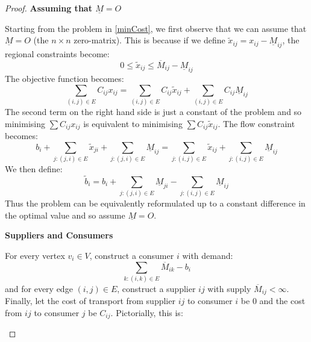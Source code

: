 \documentclass[../main.tex]{subfiles}
\begin{document}
\begin{proof}\par
  \textbf{Assuming that $\underline{M} = O$}\par
  Starting from the problem in \cref{minCost}, we first observe that we can assume that $\underline{M} = O$ (the $n \times n$ zero-matrix).
  This is because if we define $\widetilde{x}_{i j} = x_{i j} - \underline{M}_{i j}$, the regional constraints become:
  \[
    0 \leq \widetilde{x}_{i j} \leq \overline{M}_{i j} - \underline{M}_{i j}
  \]
  The objective function becomes:
  \[
    \sum_{(i, j) \in E} C_{i j}x_{i j} = \sum_{(i, j) \in E} C_{i j} \widetilde{x}_{i j} + \sum_{(i, j) \in E} C_{i j} \underline{M}_{i j}
  \]
  The second term on the right hand side is just a constant of the problem and so minimising $\sum C_{i j} x_{i j}$ is equivalent to minimising $\sum C_{i j} \widetilde{x}_{i j}$.
  The flow constraint becomes:
  \[
    b_i + \sum_{j: (j, i) \in E} \widetilde{x}_{j i} + \sum_{j: (j, i) \in E} \underline{M}_{i j} = \sum_{j: (i, j) \in E} \widetilde{x}_{i j} + \sum_{j: (i, j) \in E} \underline{M}_{i j}
  \]
  We then define:
  \[
    \widetilde{b}_i = b_i + \sum_{j: (j, i) \in E} \underline{M}_{j i} - \sum_{j: (i, j) \in E} \underline{M}_{i j}
  \]
  Thus the problem can be equivalently reformulated up to a constant difference in the optimal value and so assume $\underline{M} = O$.

  \textbf{Suppliers and Consumers}\par
  For every vertex $v_i \in V$, construct a consumer $i$ with demand:
  \[
    \sum_{k: (i, k) \in E} \overline{M}_{i k} - b_i
  \]
  and for every edge $(i, j) \in E$, construct a supplier $ij$ with supply $\overline{M}_{i j} < \infty$.
  Finally, let the cost of transport from supplier $ij$ to consumer $i$ be 0 and the cost from $ij$ to consumer $j$ be $C_{i j}$.
  Pictorially, this is:
  \begin{center}
\end{center}
\end{proof}
\end{document}
